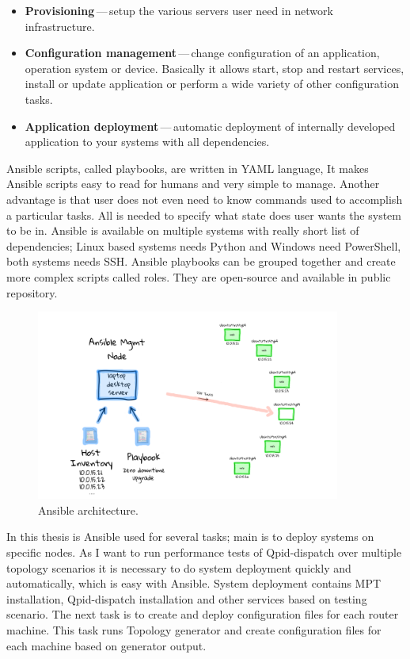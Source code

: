 \begin{itemize}
	\item \textbf{Provisioning}\,---\,setup the various servers user need in network infrastructure.
	\item \textbf{Configuration management}\,---\,change configuration of an application, operation system or device. Basically it allows start, stop and restart services, install or update application or perform a wide variety of other configuration tasks.
	\item \textbf{Application deployment}\,---\,automatic deployment of internally developed application to your systems with all dependencies.
\end{itemize}

Ansible scripts, called playbooks, are written in YAML language, It makes Ansible scripts easy to read for humans and very simple to manage. Another advantage is that user does not even need to know commands used to accomplish a particular tasks. All is needed to specify what state does user wants the system to be in. Ansible is available on multiple systems with really short list of dependencies; Linux based systems needs Python and Windows need PowerShell, both systems needs SSH. Ansible playbooks can be grouped together and create more complex scripts called roles. They are open-source and available in public repository.

\begin{figure}[H]
  \centering
  \includegraphics[width=10cm]{obrazky-figures/ansible.png}
  \caption{Ansible architecture. }
  \label{fig:ansible_architecture}
\end{figure}

In this thesis is Ansible used for several tasks; main is to deploy systems on specific nodes. As I want to run performance tests of Qpid-dispatch over multiple topology scenarios it is necessary to do system deployment quickly and automatically, which is easy with Ansible. System deployment contains MPT installation, Qpid-dispatch installation and other services based on testing scenario. The next task is to create and deploy configuration files for each router machine. This task runs Topology generator and create configuration files for each machine based on generator output.


